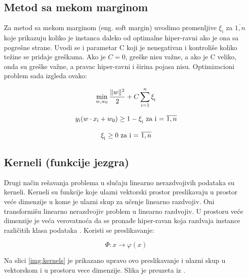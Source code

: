 \documentclass[12pt,oneside]{memoir}
\begin{document}
\subsection{Metod sa mekom marginom}

Za metod sa mekom marginom (eng. soft margin) uvodimo promenljive $\xi_i$ za $\overline{1,n}$ koje prikazuju koliko je instanca daleko od optimalne hiper-ravni ako je ona sa pogrešne strane.  Uvodi se i parametar C koji je nenegativan i kontroliše koliko težine se pridaje greškama. Ako je $C=0$, greške nisu važne, a ako je C veliko, onda su greške važne, a pravac hiper-ravni i širina pojasa nisu. Optimizacioni problem sada izgleda ovako:

\begin{equation}
	\min_{w,w_0} \frac{\|w\|^{2}}{2} + C \sum_{i=1}^{n} \xi_\textsubscript{i} \notag\\
\end{equation}

\begin{equation}
	y\textsubscript{i}(w \cdot x\textsubscript{i} + w_0) \geq 1 - \xi_\textsubscript{i} \text{ za i = } \overline{1,n} \notag\\
\end{equation}

\begin{equation}
	\xi_\textsubscript{i} \geq 0 \text{ za i = } \overline{1,n}
\end{equation}

\subsection{Kerneli (funkcije jezgra)}

Drugi način rešavanja problema u slučaju linearno nerazdvojivih podataka su kerneli. Kerneli su funkcije koje ulazni vektorski prostor preslikavaju u prostor veće dimenzije u kome je ulazni skup za učenje linearno razdvojiv. Oni transformišu linearno nerazdvojiv problem u linearno razdvojiv. U prostoru veće dimenzije je veća verovatnoća da se pronađe hiper-ravan koja razdvaja instance različitih klasa podataka \cite{JelenaPHD}.
\noindent
Koristi se preslikavanje:

\begin{equation}
	\Phi : x \rightarrow \varphi(x)
\end{equation}

\noindent
Na slici \ref{img:kernels} je prikazano upravo ovo preslikavanje i ulazni skup u vektorskom i u prostoru vece dimenzije. Slika je preuzeta iz \cite{JelenaPHD}.
\end{document}
